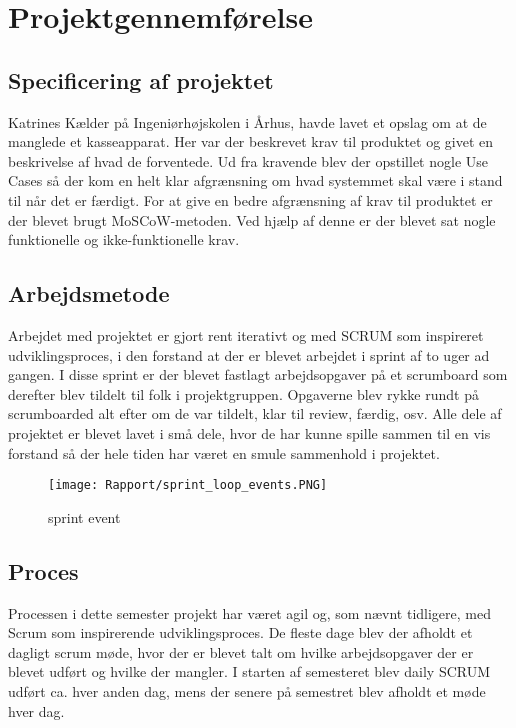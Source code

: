 \section{Projektgennemførelse}
\subsection{Specificering af projektet}
Katrines Kælder på Ingeniørhøjskolen i Århus, havde lavet et opslag om at de manglede et kasseapparat. Her var der beskrevet krav til produktet og givet en beskrivelse af hvad de forventede. Ud fra kravende blev der opstillet nogle Use Cases så der kom en helt klar afgrænsning om hvad systemmet skal være i stand til når det er færdigt.
\newline
\newline
For at give en bedre afgrænsning af krav til produktet er der blevet brugt MoSCoW-metoden. Ved hjælp af denne er der blevet sat nogle funktionelle og ikke-funktionelle krav.  


\subsection{Arbejdsmetode}
Arbejdet med projektet er gjort rent iterativt og med SCRUM som inspireret  udviklingsproces, i den forstand at der er blevet arbejdet i sprint af to uger ad gangen. I disse sprint er der blevet fastlagt arbejdsopgaver på et scrumboard som derefter blev tildelt til folk i projektgruppen. Opgaverne blev rykke rundt på scrumboarded alt efter om de var tildelt, klar til review, færdig, osv. 
\newline
\newline
Alle dele af projektet er blevet lavet i små dele, hvor de har kunne spille sammen til en vis forstand så der hele tiden har været en smule sammenhold i projektet. 

\begin{figure}[H]
	\centering
	\texttt{[image: Rapport/sprint\_loop\_events.PNG]}
	\caption{sprint event}
	\label{fig:sprint}
\end{figure} 

\subsection{Proces}
Processen i dette semester projekt har været agil og, som nævnt tidligere, med Scrum som inspirerende udviklingsproces.
\newline
\newline
De fleste dage blev der afholdt et dagligt scrum møde, hvor der er blevet talt om hvilke arbejdsopgaver der er blevet udført og hvilke der mangler. I starten af semesteret blev daily SCRUM udført ca. hver anden dag, mens der senere på semestret blev afholdt et møde hver dag. 



